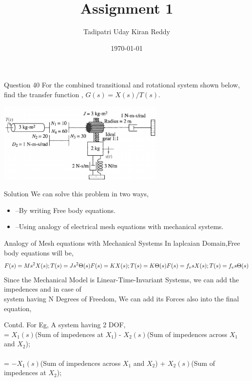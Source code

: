 \documentclass{beamer}
\title{Assignment 1}
\author{Tadipatri Uday Kiran Reddy}
\date{\today}
\numberwithin{equation}{section}
\begin{document}
\begin{frame}
\titlepage
\end{frame}

\begin{frame}{Question 40}
    For the combined transitional and rotational system shown below, find the transfer function , $G(s) = X(s)/T(s)$.
    \begin{center}
        \includegraphics[height= 4cm]{./figs/Question_40.png}
    \end{center}
    
\end{frame}

\begin{frame}{Solution}
     We can solve this problem in two ways,
     \begin{itemize}
         \item --By writing Free body equations.
         \item --Using analogy of electrical mesh equations with mechanical systems.
     \end{itemize}
\end{frame}

\begin{frame}{Analogy of Mesh equations with Mechanical Systems}
    In laplcaian Domain,Free body equations will be,
        \begin{equation*}
            F(s) = M{s^2}{X(s)}; T(s) = J{s^2}{\Theta(s)}\\
            F(s) = K X(s); T(s) = K \Theta(s)\\
            F(s) = f_{v}sX(s); T(s) = f_{v}s\Theta(s)\\
        \end{equation*}
    Since the Mechanical Model is Linear-Time-Invariant Systems, we can add the impedences and in case of\\
    system having N Degrees of Freedom, We can add its Forces also into the final equation,\\
\end{frame}
    
\begin{frame}{Contd.}
     For Eg, A system having 2 DOF,\\
        [Sum of Applied Forces on $X_1$] = $X_1(s)$(Sum of impedences at $X_1$) - $X_2(s)$(Sum of impedences across $X_1$ and $X_2$);\\
        \\[Sum of Applied Forces on $X_2$] = $-X_1(s)$(Sum of impedences across $X_1$ and $X_2$) + $X_2(s)$(Sum of impedences at $X_2$);
\end{frame}
\end{document}
